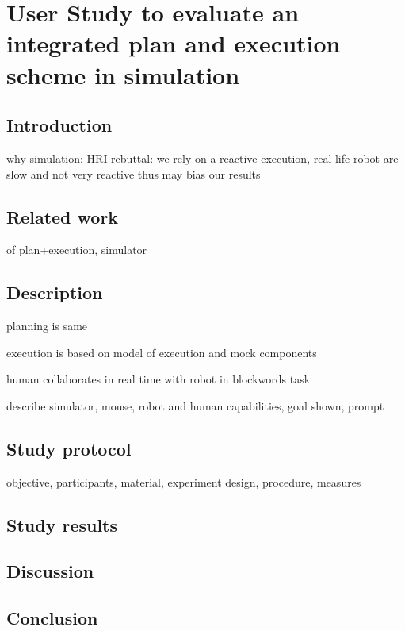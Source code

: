 \ifdefined{}
\else
\setcounter{chapter}{4} 
\dominitoc
\faketableofcontents
\fi

\chapter{User Study to evaluate an integrated plan and execution scheme in simulation}
\label{chap:5}
\minitoc

\section{Introduction}

why simulation: HRI rebuttal: we rely on a reactive execution, real life robot are slow and not very reactive thus may bias our results

\section{Related work}
of plan+execution, simulator

\section{Description}
planning is same

execution is based on model of execution and mock components

human collaborates in real time with robot in blockwords task

describe simulator, mouse, robot and human capabilities, goal shown, prompt

\section{Study protocol}

objective, participants, material, experiment design, procedure, measures

\section{Study results}

\section{Discussion}
\section{Conclusion}

